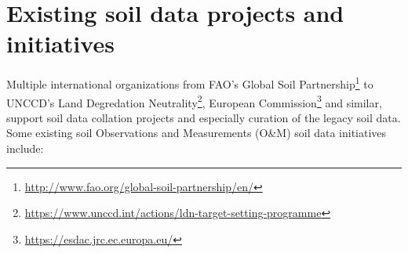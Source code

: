 \documentclass[
  graybox,natbib,nospthms]{svmono}
\renewcommand{\href}[2]{#2 (\url{#1})}
\renewcommand{\href}[2]{#2\footnote{\url{#1}}}
\begin{document}
\hypertarget{existing-soil-data-projects-and-initiatives}{%
\section{Existing soil data projects and initiatives}\label{existing-soil-data-projects-and-initiatives}}

Multiple international organizations from \href{http://www.fao.org/global-soil-partnership/en/}{FAO's Global Soil Partnership} to \href{https://www.unccd.int/actions/ldn-target-setting-programme}{UNCCD's Land Degredation Neutrality}, \href{https://esdac.jrc.ec.europa.eu/}{European Commission} and similar,
support soil data collation projects and especially curation of the legacy soil data.
Some existing soil Observations and Measurements (O\&M) soil data initiatives include:
\end{document}
